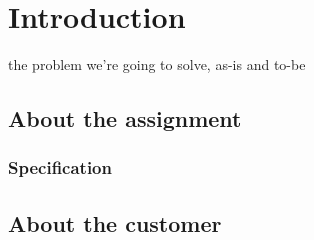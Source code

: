 \chapter{Introduction}
the problem we're going to solve, as-is and to-be

\section{About the assignment}
\subsection{Specification}


\section{About the customer}


